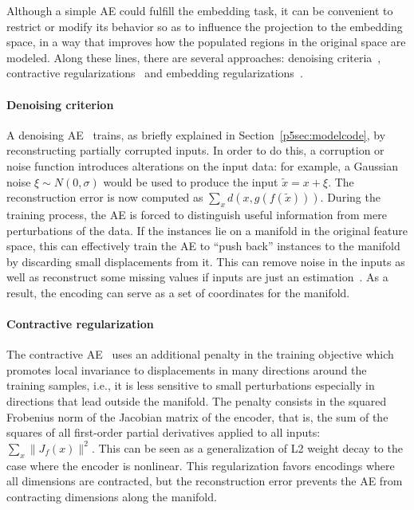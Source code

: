 Although a simple AE could fulfill the embedding task, it can be convenient to restrict or modify its behavior so as to influence the projection to the embedding space, in a way that improves how the populated regions in the original space are modeled. Along these lines, there are several approaches: denoising criteria~\cite{vincent2008extracting}, contractive regularizations~\cite{contractive} and embedding regularizations~\cite{yu2013embedding}.

\paragraph{Denoising criterion} A denoising AE~\cite{vincent2008extracting} trains, as briefly explained in Section~\ref{p5sec:modelcode}, by reconstructing partially corrupted inputs. In order to do this, a corruption or noise function introduces alterations on the input data: for example, a Gaussian noise $\xi\sim N(0,\sigma)$ would be used to produce the input $\tilde{x} = x + \xi$. The reconstruction error is now computed as $\sum_x d(x, g(f(\tilde x)))$. During the training process, the AE is forced to distinguish useful information from mere perturbations of the data. If the instances lie on a manifold in the original feature space, this can effectively train the AE to ``push back'' instances to the manifold by discarding small displacements from it. This can remove noise in the inputs as well as reconstruct some missing values if inputs are just an estimation~\cite{xie,li2015feature}. As a result, the encoding can serve as a set of coordinates for the manifold.

\paragraph{Contractive regularization} The contractive AE~\cite{contractive} uses an additional penalty in the training objective which promotes local invariance to displacements in many directions around the training samples, i.e., it is less sensitive to small perturbations especially in directions that lead outside the manifold. The penalty consists in the squared Frobenius norm of the Jacobian matrix of the encoder, that is, the sum of the squares of all first-order partial derivatives applied to all inputs: $\sum_x\lVert J_f(x)\rVert^2$. This can be seen as a generalization of L2 weight decay to the case where the encoder is nonlinear. This regularization favors encodings where all dimensions are contracted, but the reconstruction error prevents the AE from contracting dimensions along the manifold.


